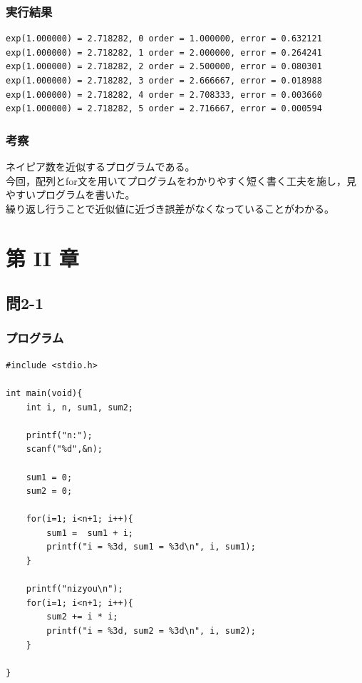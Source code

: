 \documentclass{jarticle}
\begin{document}
\subsubsection{実行結果\\}
\begin{breakbox}
\begin{verbatim}
exp(1.000000) = 2.718282, 0 order = 1.000000, error = 0.632121 
exp(1.000000) = 2.718282, 1 order = 2.000000, error = 0.264241 
exp(1.000000) = 2.718282, 2 order = 2.500000, error = 0.080301 
exp(1.000000) = 2.718282, 3 order = 2.666667, error = 0.018988 
exp(1.000000) = 2.718282, 4 order = 2.708333, error = 0.003660 
exp(1.000000) = 2.718282, 5 order = 2.716667, error = 0.000594 
\end{verbatim}
\end{breakbox}
\subsubsection{考察\\}
ネイピア数を近似するプログラムである。\\
今回，配列とfor文を用いてプログラムをわかりやすく短く書く工夫を施し，見やすいプログラムを書いた。\\
繰り返し行うことで近似値に近づき誤差がなくなっていることがわかる。\\

\section{第 II 章\\}

\subsection{問2-1\\}
\subsubsection{プログラム\\}
\begin{breakbox}
\begin{verbatim}
#include <stdio.h>

int main(void){
	int i, n, sum1, sum2;

	printf("n:");
	scanf("%d",&n);

	sum1 = 0;
	sum2 = 0;

	for(i=1; i<n+1; i++){
		sum1 =  sum1 + i;
		printf("i = %3d, sum1 = %3d\n", i, sum1);
	}

	printf("nizyou\n");
	for(i=1; i<n+1; i++){
		sum2 += i * i;
		printf("i = %3d, sum2 = %3d\n", i, sum2);
	}

}
\end{verbatim}
\end{breakbox}
\end{document}
